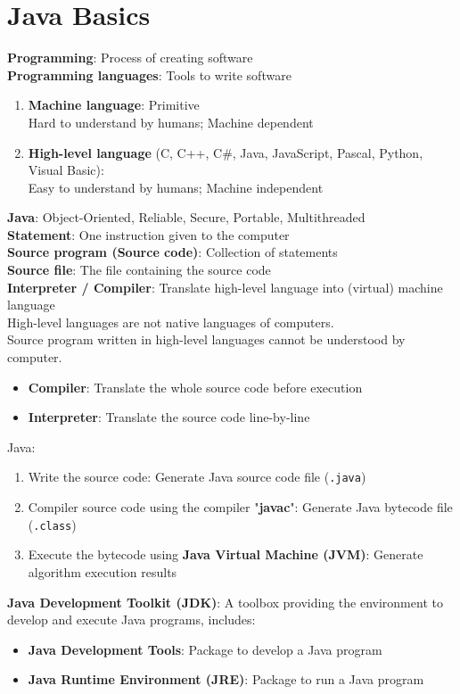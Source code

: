 \documentclass{article}
\begin{document}
\section{Java Basics}
\textbf{Programming}: Process of creating software\\
\textbf{Programming languages}: Tools to write software
\begin{enumerate}
	\item \textbf{Machine language}: Primitive\\
	Hard to understand by humans; Machine dependent
	\item \textbf{High-level language} (C, C++, C\#, Java, JavaScript, Pascal, Python, Visual Basic):\\
	Easy to understand by humans; Machine independent
\end{enumerate}
\textbf{Java}: Object-Oriented, Reliable, Secure, Portable, Multithreaded\\
\textbf{Statement}: One instruction given to the computer\\
\textbf{Source program (Source code)}: Collection of statements\\
\textbf{Source file}: The file containing the source code\\
\textbf{Interpreter / Compiler}: Translate high-level language into (virtual) machine language\\ 
High-level languages are not native languages of computers.\\
Source program written in high-level languages cannot be understood by computer.
\begin{itemize}
	\item \textbf{Compiler}: Translate the whole source code before execution
	\item \textbf{Interpreter}: Translate the source code line-by-line
\end{itemize}
Java:
\begin{enumerate}
	\item Write the source code: Generate Java source code file (\texttt{.java})
	\item Compiler source code using the compiler "\textbf{javac}": Generate Java bytecode file (\texttt{.class})
	\item Execute the bytecode using \textbf{Java Virtual Machine (JVM)}: Generate algorithm execution results
\end{enumerate}
\textbf{Java Development Toolkit (JDK)}: A toolbox providing the environment to develop and execute Java programs, includes:
\begin{itemize}
	\item \textbf{Java Development Tools}: Package to develop a Java program
	\item \textbf{Java Runtime Environment (JRE)}: Package to run a Java program
\end{itemize}
\end{document}
